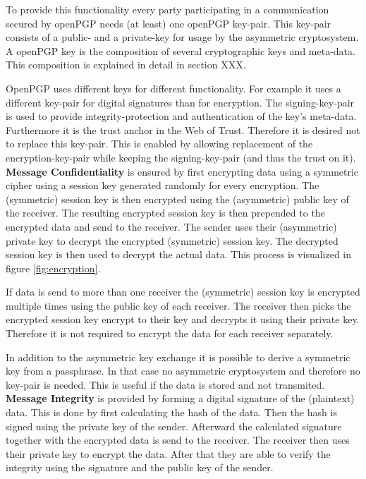 To provide this functionality every party participating in a communication secured by openPGP needs (at least) one openPGP key-pair. This key-pair consists of a public- and a private-key for usage by the asymmetric cryptosystem. A openPGP key is the composition of several cryptographic keys and meta-data. This composition is explained in detail in section XXX. 


OpenPGP uses different keys for different functionality. For example it uses a different key-pair for digital signatures than for encryption. The signing-key-pair is used to provide integrity-protection and authentication of the key's meta-data. Furthermore it is the trust anchor in the Web of Trust. Therefore it is desired not to replace this key-pair. This is enabled by allowing replacement of the encryption-key-pair while keeping the signing-key-pair (and thus the trust on it).\\


\textbf{Message Confidentiality} is ensured by first encrypting data using a symmetric cipher using a session key generated randomly for every encryption. The (symmetric) session key is then encrypted using the (asymmetric) public key of the receiver. The resulting encrypted session key is then prepended to the encrypted data and send to the receiver. The sender uses their (asymmetric) private key to decrypt the encrypted (symmetric) session key. The decrypted session key is then used to decrypt the actual data. This process is visualized in figure \ref{fig:encryption}.

If data is send to more than one receiver the (symmetric) session key is encrypted  multiple times using the public key of each receiver. The receiver then picks the encrypted session key encrypt to their key and decrypts it using their private key. Therefore it is not required to encrypt the data for each receiver separately.

In addition to the asymmetric key exchange it is possible to derive a symmetric key from a passphrase. In that case no asymmetric cryptosystem and therefore no key-pair is needed. This is useful if the data is stored and not transmited.\\

\textbf{Message Integrity} is provided by forming a digital signature of the (plaintext) data. This is done by first calculating the hash of the data. Then the hash is signed using the private key of the sender. Afterward the calculated signature together with the encrypted data is send to the receiver. The receiver then uses their private key to encrypt the data. After that they are able to verify the integrity using the signature and the public key of the sender.

